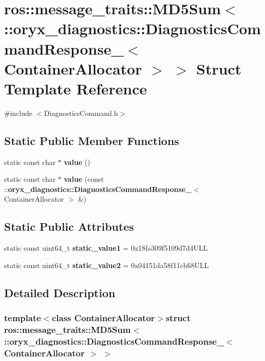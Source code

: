 \section{ros\-:\-:message\-\_\-traits\-:\-:\-M\-D5\-Sum$<$ \-:\-:oryx\-\_\-diagnostics\-:\-:\-Diagnostics\-Command\-Response\-\_\-$<$ \-Container\-Allocator $>$ $>$ \-Struct \-Template \-Reference}
\label{structros_1_1message__traits_1_1MD5Sum_3_01_1_1oryx__diagnostics_1_1DiagnosticsCommandResponse__9e7bcf2762b7d31617ca49cd941f436d}


{\ttfamily \#include $<$\-Diagnostics\-Command.\-h$>$}

\subsection*{\-Static \-Public \-Member \-Functions}
\begin{DoxyCompactItemize}
\item 
static const char $\ast$ {\bf value} ()
\item 
static const char $\ast$ {\bf value} (const \-::{\bf oryx\-\_\-diagnostics\-::\-Diagnostics\-Command\-Response\-\_\-}$<$ \-Container\-Allocator $>$ \&)
\end{DoxyCompactItemize}
\subsection*{\-Static \-Public \-Attributes}
\begin{DoxyCompactItemize}
\item 
static const uint64\-\_\-t {\bf static\-\_\-value1} = 0x18fa309f5109d7d4\-U\-L\-L
\item 
static const uint64\-\_\-t {\bf static\-\_\-value2} = 0x04151da58f11cb68\-U\-L\-L
\end{DoxyCompactItemize}


\subsection{\-Detailed \-Description}
\subsubsection*{template$<$class Container\-Allocator$>$struct ros\-::message\-\_\-traits\-::\-M\-D5\-Sum$<$ \-::oryx\-\_\-diagnostics\-::\-Diagnostics\-Command\-Response\-\_\-$<$ Container\-Allocator $>$ $>$}



